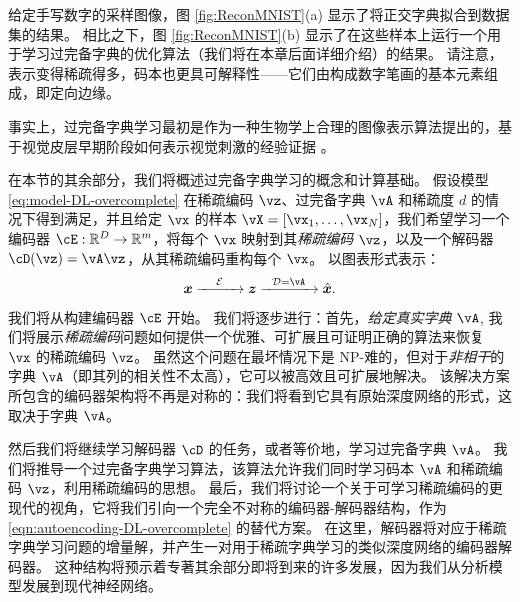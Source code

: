 \documentclass[../../book-main_zh.tex]{subfiles}
\begin{document}
\begin{example}
给定手写数字的采样图像，图 \ref{fig:ReconMNIST}(a) 显示了将正交字典拟合到数据集的结果。
相比之下，图 \ref{fig:ReconMNIST}(b) 显示了在这些样本上运行一个用于学习过完备字典的优化算法（我们将在本章后面详细介绍）的结果。
请注意，表示变得稀疏得多，码本也更具可解释性——它们由构成数字笔画的基本元素组成，即定向边缘。
\end{example}


事实上，过完备字典学习最初是作为一种生物学上合理的图像表示算法提出的，基于视觉皮层早期阶段如何表示视觉刺激的经验证据 \cite{Olshausen1996-ap,Olshausen1997-yv}。

在本节的其余部分，我们将概述过完备字典学习的概念和计算基础。
假设模型 \eqref{eq:model-DL-overcomplete} 在稀疏编码 \(\vz\)、过完备字典 \(\vA\) 和稀疏度 \(\textit{d}\) 的情况下得到满足，并且给定 \(\vx\) 的样本 \(\vX = [\vx_1, \dots, \vx_N]\)，我们希望学习一个编码器 \(\cE : \R^D \to \R^m\)，将每个 \(\vx\) 映射到其\textit{稀疏编码} \(\vz\)，以及一个解码器 \(\cD(\vz) = \vA \vz\)，从其稀疏编码重构每个 \(\vx\)。%
以图表形式表示：
\begin{equation}
\x \xrightarrow{\hspace{4mm} \mathcal{E} \hspace{4mm}}  \z \xrightarrow{\hspace{2mm} \mathcal{D} = \vA \hspace{2mm}}   \hat{\x}.  
\label{eqn:autoencoding-DL-overcomplete}
\end{equation}    

我们将从构建编码器 $\cE$ 开始。
我们将逐步进行：首先，\textit{给定真实字典 $\vA$}, 我们将展示\textit{稀疏编码}问题如何提供一个优雅、可扩展且可证明正确的算法来恢复 $\vx$ 的稀疏编码 $\vz$。
虽然这个问题在最坏情况下是 NP-难的，但对于\textit{非相干}的字典 $\vA$（即其列的相关性不太高），它可以被高效且可扩展地解决。
该解决方案所包含的编码器架构将不再是对称的：我们将看到它具有原始深度网络的形式，这取决于字典 $\vA$。

然后我们将继续学习解码器 $\cD$ 的任务，或者等价地，学习过完备字典 $\vA$。
我们将推导一个过完备字典学习算法，该算法允许我们同时学习码本 $\vA$ 和稀疏编码 $\vz$，利用稀疏编码的思想。
最后，我们将讨论一个关于可学习稀疏编码的更现代的视角，它将我们引向一个完全不对称的编码器-解码器结构，作为 \eqref{eqn:autoencoding-DL-overcomplete} 的替代方案。
在这里，解码器将对应于稀疏字典学习问题的增量解，并产生一对用于稀疏字典学习的类似深度网络的编码器解码器。
这种结构将预示着专著其余部分即将到来的许多发展，因为我们从分析模型发展到现代神经网络。
\end{document}

